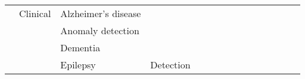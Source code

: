 \begin{tabular}{p{1.5cm}p{1.5cm}p{1.5cm}p{1.5cm}p{0.6cm}p{0.6cm}p{0.6cm}p{0.6cm}p{0.6cm}p{0.6cm}p{0.6cm}p{0.6cm}p{0.6cm}p{0.6cm}p{0.6cm}}
                                & Clinical & Alzheimer's disease &   &                                                             &                                                                                                         \cite{Morabito2016} &                                                                        &                  &                                      &                                                            &                      &                       &                                 &                         &                                                                      \\
                                &                 & Anomaly detection &   &                                                             &                                                                                                                             &                                                                        &                  &                    \cite{Wulsin2011} &                                                            &                      &                       &                                 &                         &                                                                      \\
                                &                 & Dementia &   &                                         \cite{Morabito2017} &                                                                                                                             &                                                                        &                  &                                      &                                                            &                      &                       &                                 &                         &                                                                      \\
                                &                 & Epilepsy & Detection &                          \cite{Yuan2018a, Golmohammadi2017} &                                                 \cite{Hao2018, Ullah2018, OShea2018, OShea2017, Acharya2017, Thodoroff2016} &  \cite{VanPutten2018a, Golmohammadi2017b, Shah2017, Golmohammadi2017a} &                  &                    \cite{Turner2014} &                                      \cite{Omerhodzic2013} &                      &       \cite{Taqi2017} &                                 &                         &  \cite{Hussein2018, Ahmedt-Aristizabal2018, Talathi2017, Naderi2010} \\

\end{tabular}
